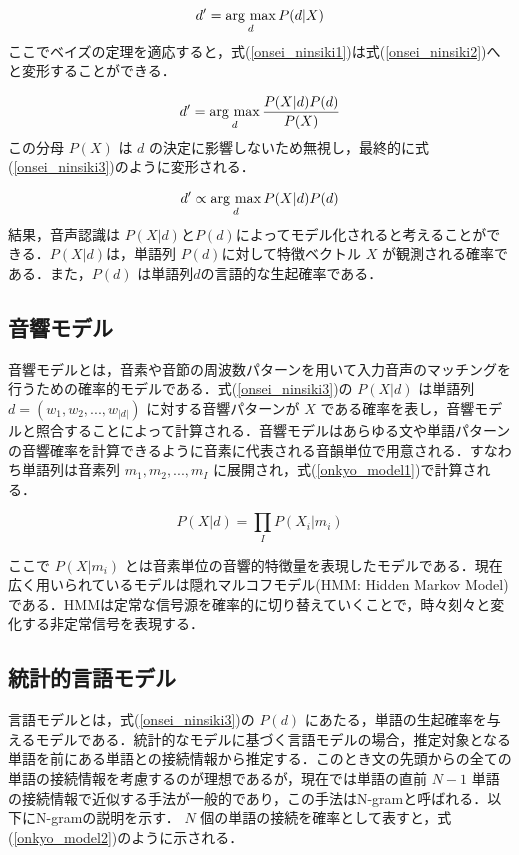 \begin{equation}
    d' = \mathop{\rm arg~max}\limits_{d} P(d|X) 
    \label{onsei_ninsiki1}
\end{equation}
ここでベイズの定理を適応すると，式(\ref{onsei_ninsiki1})は式(\ref{onsei_ninsiki2})へと変形することができる．

\begin{equation}
    d' = \mathop{\rm arg~max}\limits_{d}  \frac{P(X|d)P(d)}{P(X)} 
    \label{onsei_ninsiki2}
\end{equation}
この分母 $P(X)$ は $d$ の決定に影響しないため無視し，最終的に式(\ref{onsei_ninsiki3})のように変形される．

\begin{equation}
    d' \propto \mathop{\rm arg~max}\limits_{d}  P(X|d)P(d) 
    \label{onsei_ninsiki3}
\end{equation}
結果，音声認識は $P(X|d)$と$P(d)$によってモデル化されると考えることができる．$P(X|d)$は，単語列 $P(d)$に対して特徴ベクトル $X$ が観測される確率である．また，$P(d)$ は単語列$d$の言語的な生起確率である．

\subsection{音響モデル}
音響モデルとは，音素や音節の周波数パターンを用いて入力音声のマッチングを行うための確率的モデルである．式(\ref{onsei_ninsiki3})の $P(X|d)$ は単語列 $d = (w_1, w_2, ..., w_{|d|})$ に対する音響パターンが $X$ である確率を表し，音響モデルと照合することによって計算される．音響モデルはあらゆる文や単語パターンの音響確率を計算できるように音素に代表される音韻単位で用意される．すなわち単語列は音素列 $m_1, m_2, ... , m_I $ に展開され，式(\ref{onkyo_model1})で計算される．

\begin{equation}
    P(X|d) = \prod_{I}  P(X_i|m_i) 
    \label{onkyo_model1}
\end{equation}

ここで $P(X|m_i)$ とは音素単位の音響的特徴量を表現したモデルである．現在広く用いられているモデルは隠れマルコフモデル(HMM: Hidden Markov Model)である．HMMは定常な信号源を確率的に切り替えていくことで，時々刻々と変化する非定常信号を表現する．

\subsection{統計的言語モデル}

言語モデルとは，式(\ref{onsei_ninsiki3})の $P(d)$ にあたる，単語の生起確率を与えるモデルである．統計的なモデルに基づく言語モデルの場合，推定対象となる単語を前にある単語との接続情報から推定する．このとき文の先頭からの全ての単語の接続情報を考慮するのが理想であるが，現在では単語の直前 $N-1$ 単語の接続情報で近似する手法が一般的であり，この手法はN-gramと呼ばれる．以下にN-gramの説明を示す． 
 $N$ 個の単語の接続を確率として表すと，式(\ref{onkyo_model2})のように示される．

